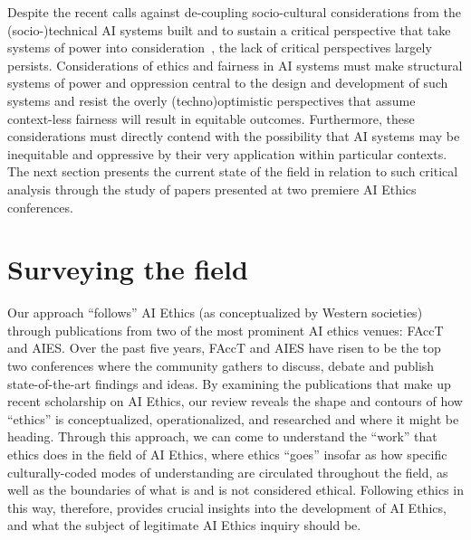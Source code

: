 \documentclass[manuscript]{acmart}
\begin{document}
Despite the recent calls against de-coupling socio-cultural considerations from the (socio-)technical AI systems built and to sustain a critical perspective that take systems of power into consideration~\cite{dancy21blackness, selbst2019fairness, hampton21blackfem}, the lack of critical perspectives largely persists. Considerations of ethics and fairness in AI systems must make structural systems of power and oppression central to the design and development of such systems and resist the overly (techno)optimistic perspectives that assume context-less fairness will result in equitable outcomes. Furthermore, these considerations must directly contend with the possibility that AI systems may be inequitable and oppressive by their very application within particular contexts. The next section presents the current state of the field in relation to such critical analysis through the study of papers presented at two premiere AI Ethics conferences.


\section{Surveying the field} 
\label{sect:surveying}
 
Our approach ``follows'' AI Ethics (as conceptualized by Western societies) through publications from two of the most prominent AI ethics venues: FAccT and AIES. 
Over the past five years, FAccT and AIES have risen to be the top two conferences where the community gathers to discuss, debate and publish state-of-the-art findings and ideas.  
By examining the publications that make up recent scholarship on AI Ethics, our review reveals the shape and contours of how ``ethics'' is conceptualized, operationalized, and researched and where it might be heading.  
Through this approach, we can come to understand the ``work'' that ethics does in the field of AI Ethics, where ethics ``goes'' insofar as how specific culturally-coded modes of understanding are circulated throughout the field, as well as the boundaries of what is and is not considered ethical. 
Following ethics in this way, therefore, provides crucial insights into the development of AI Ethics, and what the subject of legitimate AI Ethics inquiry should be. 
\end{document}
